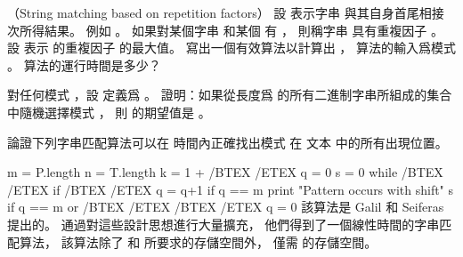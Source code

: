 \startsubject[
  title={Problems},
]

\startPROBLEM
（String matching based on repetition factors）
設  表示字串  與其自身首尾相接  次所得結果。
例如 。
如果對某個字串  和某個  有 ，
則稱字串  具有{\EMP 重複因子} 。
設  表示  的重複因子  的最大值。
\startigBase[a]\startitem
寫出一個有效算法以計算出  ，
算法的輸入爲模式 。
算法的運行時間是多少？
\stopitem\stopigBase

\startANSWER
{}
\stopANSWER

\startigBase[continue]\startitem
對任何模式 ，設  定義爲 。
證明：如果從長度爲  的所有二進制字串所組成的集合中隨機選擇模式 ，
則  的期望值是 。
\stopitem\stopigBase

\startANSWER
{}
\stopANSWER

\startigBase[continue]\startitem
論證下列字串匹配算法可以在  時間內正確找出模式  在
文本  中的所有出現位置。

\startCLRS
m = P.length
n = T.length
k = 1 + /BTEX  /ETEX
q = 0
s = 0
while /BTEX  /ETEX
	if /BTEX  /ETEX
		q = q+1
		if q == m
			print "Pattern occurs with shift" s
	if q == m or /BTEX  /ETEX
		/BTEX  /ETEX
		q = 0
\stopCLRS
該算法是 Galil 和 Seiferas 提出的。
通過對這些設計思想進行大量擴充，
他們得到了一個線性時間的字串匹配算法，
該算法除了  和  所要求的存儲空間外，
僅需  的存儲空間。
\stopitem\stopigBase

\startANSWER
{}
\stopANSWER
\stopPROBLEM

\stopsubject%
